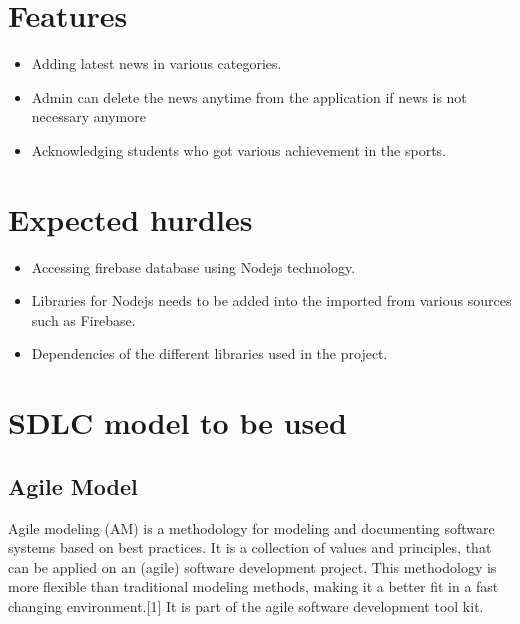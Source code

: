 \section{Features}
\begin{itemize}
	\item Adding latest news in various categories.
	
	\item Admin can delete the news anytime from the application if news is not necessary anymore 
	 \item Acknowledging students who got various achievement in the sports.
\end{itemize}

	 	
\section{Expected hurdles}
\begin{itemize}
\item Accessing firebase database using Nodejs technology.  
\item Libraries for Nodejs needs to be added into the imported from various sources such as Firebase.
\item Dependencies of the different libraries used in the project.

\end{itemize}

\section{SDLC model to be used}
\subsection{Agile Model}

 Agile modeling (AM) is a methodology for modeling and documenting software systems based on best practices. It is a collection of values and principles, that can be applied on an (agile) software development project. This methodology is more flexible than traditional modeling methods, making it a better fit in a fast changing environment.[1] It is part of the agile software development tool kit.
 
